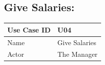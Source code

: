 \documentclass[12pt]{article}
\begin{document}
\subsection{Give Salaries:}

\begin{table}[H]
\begin{tabular}{|l|l|}
\hline
Use Case ID & U04                                                                                                                                                                                                                                                                                                                                                                                                                                                                                                                                                                                                                                                                                                                                                                                                                                                                                                                                                              \\ \hline
Name        & Give Salaries                                                                                                                                                                                                                                                                                                                                                                                                                                                                                                                                                                                                                                                                                                                                                                                                                                                                                                                                                    \\ \hline
Actor       & The Manager                                                                                                                                                                                                                                                                                                                                                                                                                                                                                                                                                                                                                                                                                                                                                                                                                                                                                                                                                      \\ \hline

\end{tabular}
\end{table}
\end{document}

